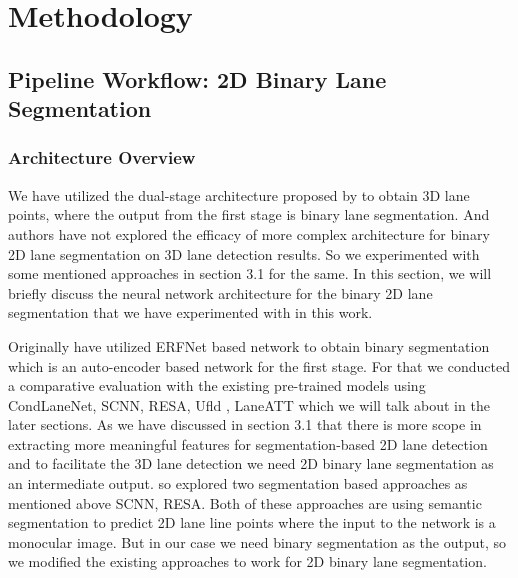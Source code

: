 

    \chapter{Methodology}

     \section{Pipeline Workflow: 2D Binary Lane Segmentation}
        \subsection{Architecture Overview}
        We have utilized the dual-stage architecture proposed by \cite{guo2020gen} to obtain 3D lane points, where the output from the first stage is binary lane segmentation. And authors have not explored the efficacy of more complex architecture for binary 2D lane segmentation on 3D lane detection results. So we experimented with some mentioned approaches in section 3.1 for the same. In this section, we will briefly discuss the neural network architecture for the binary 2D lane segmentation that we have experimented with in this work. 
        
        Originally \cite{guo2020gen} have utilized ERFNet\cite{Romera2018ERFNetER} based network to obtain binary segmentation which is an auto-encoder based network for the first stage. For that we conducted a comparative evaluation with the existing pre-trained models using CondLaneNet\cite{DBLP:journals/corr/abs-2105-05003}, SCNN\cite{pan2018SCNN}, RESA\cite{DBLP:journals/corr/abs-2008-13719}, Ufld \cite{DBLP:journals/corr/abs-2004-11757}, LaneATT\cite{https://doi.org/10.48550/arxiv.2010.12035} which we will talk about in the later sections. As we have discussed in section 3.1 that there is more scope in extracting more meaningful features for segmentation-based 2D lane detection and to facilitate the 3D lane detection we need 2D binary lane segmentation as an intermediate output. so explored two segmentation based approaches as mentioned above SCNN\cite{pan2018SCNN}, RESA\cite{DBLP:journals/corr/abs-2008-13719}. Both of these approaches are using semantic segmentation to predict 2D lane line points where the input to the network is a monocular image. But in our case we need binary segmentation as the output, so we modified the existing approaches to work for 2D binary lane segmentation.    
        
